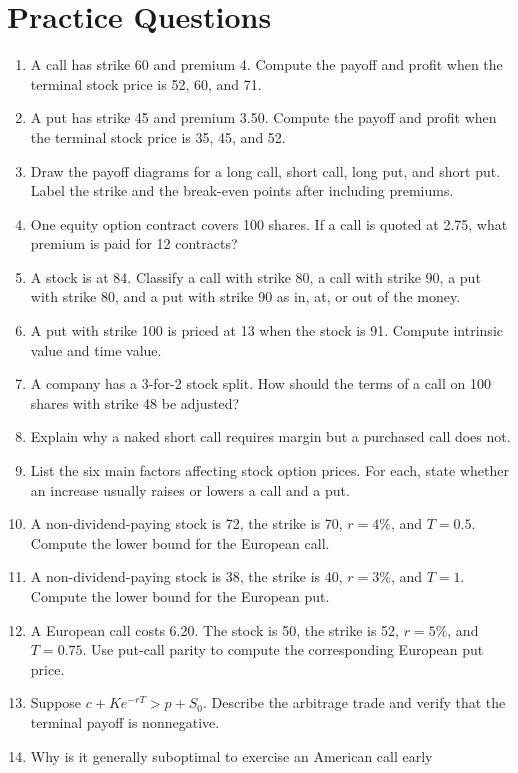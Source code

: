 \section{Practice Questions}

\begin{enumerate}
    \item A call has strike 60 and premium 4. Compute the payoff and profit when
    the terminal stock price is 52, 60, and 71.
    \item A put has strike 45 and premium 3.50. Compute the payoff and profit
    when the terminal stock price is 35, 45, and 52.
    \item Draw the payoff diagrams for a long call, short call, long put, and
    short put. Label the strike and the break-even points after including
    premiums.
    \item One equity option contract covers 100 shares. If a call is quoted at
    2.75, what premium is paid for 12 contracts?
    \item A stock is at 84. Classify a call with strike 80, a call with strike
    90, a put with strike 80, and a put with strike 90 as in, at, or out of the
    money.
    \item A put with strike 100 is priced at 13 when the stock is 91. Compute
    intrinsic value and time value.
    \item A company has a 3-for-2 stock split. How should the terms of a call on
    100 shares with strike 48 be adjusted?
    \item Explain why a naked short call requires margin but a purchased call
    does not.
    \item List the six main factors affecting stock option prices. For each,
    state whether an increase usually raises or lowers a call and a put.
    \item A non-dividend-paying stock is 72, the strike is 70, $r=4\%$, and
    $T=0.5$. Compute the lower bound for the European call.
    \item A non-dividend-paying stock is 38, the strike is 40, $r=3\%$, and
    $T=1$. Compute the lower bound for the European put.
    \item A European call costs 6.20. The stock is 50, the strike is 52,
    $r=5\%$, and $T=0.75$. Use put-call parity to compute the corresponding
    European put price.
    \item Suppose $c+Ke^{-rT}>p+S_0$. Describe the arbitrage trade and verify
    that the terminal payoff is nonnegative.
    \item Why is it generally suboptimal to exercise an American call early

\end{enumerate}
